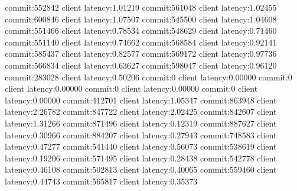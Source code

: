 commit:552842 client latency:1.01219
commit:561048 client latency:1.02455
commit:600846 client latency:1.07507
commit:545500 client latency:1.04608
commit:551466 client latency:0.78534
commit:548629 client latency:0.71460
commit:551140 client latency:0.74662
commit:568584 client latency:0.92141
commit:585437 client latency:0.82577
commit:569172 client latency:0.97736
commit:566834 client latency:0.63627
commit:598047 client latency:0.96120
commit:283028 client latency:0.50206
commit:0 client latency:0.00000
commit:0 client latency:0.00000
commit:0 client latency:0.00000
commit:0 client latency:0.00000
commit:412701 client latency:1.05347
commit:863948 client latency:2.26782
commit:847722 client latency:2.02425
commit:842607 client latency:1.31266
commit:871496 client latency:0.12319
commit:887627 client latency:0.30966
commit:884207 client latency:0.27943
commit:748583 client latency:0.47277
commit:541440 client latency:0.56073
commit:538619 client latency:0.19206
commit:571495 client latency:0.28438
commit:542778 client latency:0.46108
commit:502813 client latency:0.40065
commit:559460 client latency:0.44743
commit:565817 client latency:0.35373